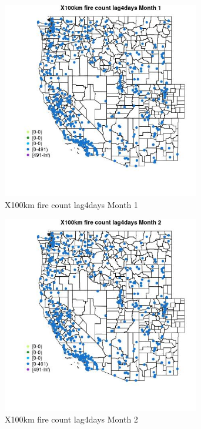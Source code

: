 \begin{figure} 
\centering  
\includegraphics[width=0.77\textwidth]{Code_Outputs/Report_ML_input_PM25_Step4_part_e_de_duplicated_aves_compiled_2019-05-14wNAs_MapObsMo1X100km_fire_count_lag4days.jpg} 
\caption{\label{fig:Report_ML_input_PM25_Step4_part_e_de_duplicated_aves_compiled_2019-05-14wNAsMapObsMo1X100km_fire_count_lag4days}X100km fire count lag4days Month 1} 
\end{figure} 
 

\begin{figure} 
\centering  
\includegraphics[width=0.77\textwidth]{Code_Outputs/Report_ML_input_PM25_Step4_part_e_de_duplicated_aves_compiled_2019-05-14wNAs_MapObsMo2X100km_fire_count_lag4days.jpg} 
\caption{\label{fig:Report_ML_input_PM25_Step4_part_e_de_duplicated_aves_compiled_2019-05-14wNAsMapObsMo2X100km_fire_count_lag4days}X100km fire count lag4days Month 2} 
\end{figure} 
 

